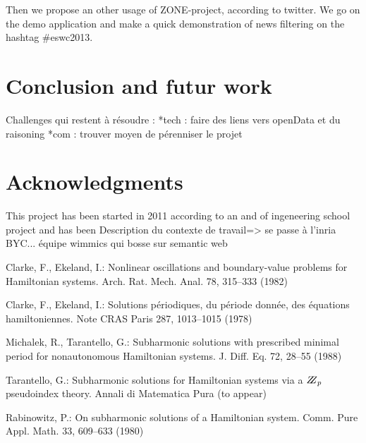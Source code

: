 \documentclass{llncs}
\begin{document}
Then we propose an other usage of ZONE-project, according to twitter. We go on the demo application and make a quick demonstration of news filtering on the hashtag #eswc2013.

\section{Conclusion and futur work}
%
Challenges qui restent à résoudre :
	*tech : faire des liens vers openData et du raisoning
	*com : trouver moyen de pérenniser le projet
%

\section{Acknowledgments}
%
This project has been started in 2011 according to an and of ingeneering school project and has been 
Description du contexte de travail=> se passe à l'inria BYC... équipe wimmics qui bosse sur semantic web

%





%
%
\begin{thebibliography}{5}
%
Clarke, F., Ekeland, I.:
Nonlinear oscillations and
boundary-value problems for Hamiltonian systems.
Arch. Rat. Mech. Anal. 78, 315--333 (1982)

Clarke, F., Ekeland, I.:
Solutions p\'{e}riodiques, du
p\'{e}riode donn\'{e}e, des \'{e}quations hamiltoniennes.
Note CRAS Paris 287, 1013--1015 (1978)

Michalek, R., Tarantello, G.:
Subharmonic solutions with prescribed minimal
period for nonautonomous Hamiltonian systems.
J. Diff. Eq. 72, 28--55 (1988)

Tarantello, G.:
Subharmonic solutions for Hamiltonian
systems via a $\bbbz_{p}$ pseudoindex theory.
Annali di Matematica Pura (to appear)

Rabinowitz, P.:
On subharmonic solutions of a Hamiltonian system.
Comm. Pure Appl. Math. 33, 609--633 (1980)

\end{thebibliography}

\clearpage
\end{document}
